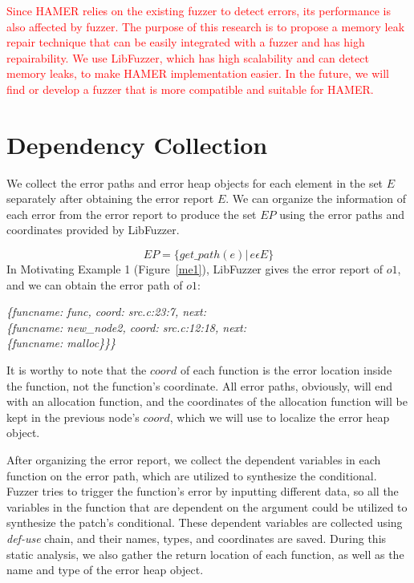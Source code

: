 \documentclass[a4paper,11pt,oneside,openany]{book}
\begin{document}
\textcolor{red}{
Since HAMER relies on the existing fuzzer to detect errors, its performance is also affected by fuzzer. The purpose of this research is to propose a memory leak repair technique that can be easily integrated with a fuzzer and has high repairability. We use LibFuzzer, which has high scalability and can detect memory leaks, to make HAMER implementation easier. In the future, we will find or develop a fuzzer that is more compatible and suitable for HAMER.
}

\section{Dependency Collection}


We collect the error paths and error heap objects for each element in the set $E$ separately after obtaining the error report $E$. We can organize the information of each error from the error report to produce the set $EP$ using the error paths and coordinates provided by LibFuzzer. 


\begin{equation}
EP=\{get\_path(e)|\, e \epsilon E\}
\end{equation}
In Motivating Example 1 (Figure~\ref{me1}), LibFuzzer gives the error report of $o1$, and we can obtain the error path of $o1$:


\begin{minipage}{\textwidth}
\vspace{0.2cm}
\textsl{\hspace{0.3cm}\{funcname: func, coord: src.c:23:7, next:\\\hspace{0.6cm}\{funcname: new\_node2, coord: src.c:12:18, next:\\\hspace{0.9cm}\{funcname: malloc\}\}\}}
\vspace{0.2cm}
\end{minipage}
It is worthy to note that the $coord$ of each function is the error location inside the function, not the function's coordinate. All error paths, obviously, will end with an allocation function, and the coordinates of the allocation function will be kept in the previous node's $coord$, which we will use to localize the error heap object.


After organizing the error report, we collect the dependent variables in each function on the error path, which are utilized to synthesize the conditional. Fuzzer tries to trigger the function's error by inputting different data, so all the variables in the function that are dependent on the argument could be utilized to synthesize the patch's conditional. These dependent variables are collected using {\it def-use} chain, and their names, types, and coordinates are saved. During this static analysis, we also gather the return location of each function, as well as the name and type of the error heap object.
\end{document}
